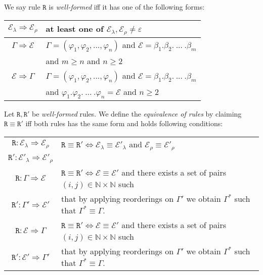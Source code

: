 \documentclass{entcs}
\renewcommand{\~}[0]{\texttildelow}
\begin{document}
\begin{defn} \label{well}
We say rule $\mathtt{R}$ is \emph{well-formed} iff it has one of the following forms:
\begin{center}
\begin{tabular}{c@{\hskip 1in}l}
	$\mathcal{E}_\lambda \Rightarrow \mathcal{E}_\rho$ & at least one of $\mathcal{E}_\lambda, \mathcal{E}_\rho \neq \varepsilon $\\
	\hline
	$\Gamma \Rightarrow \mathcal{E}$ & $\Gamma = (\varphi_1, \varphi_2, ..., \varphi_n) $ and $\mathcal{E} = \beta_1.\beta_2.~...~.\beta_m$ \\
	 & and $ m \geq n $ and $n \geq 2$ \\
	 \hline
	$\mathcal{E} \Rightarrow \Gamma$ & $\Gamma = (\varphi_1, \varphi_2, ..., \varphi_n) $ and $\mathcal{E} = \beta_1.\beta_2.~...~.\beta_m$ \\
	 & and $ \varphi_1.\varphi_2.~...~.\varphi_n = \mathcal{E} $ and $n \geq 2$\\
\end{tabular}
\end{center}
\end{defn}

\begin{defn}
Let $\mathtt{R},\mathtt{R}'$ be \emph{well-formed} rules. We define the \emph{equivalence of rules} by claiming $\mathtt{R} \equiv \mathtt{R}'$ iff both rules has the same form and holds following conditions:

\begin{center}
\begin{tabular}{c@{\hskip 1in}l}
	$\mathtt{R}: \mathcal{E}_\lambda \Rightarrow \mathcal{E}_\rho$ & $\mathtt{R} \equiv \mathtt{R}' \Leftrightarrow \mathcal{E}_\lambda \equiv \mathcal{E}'_\lambda$ and $\mathcal{E}_\rho \equiv \mathcal{E}'_\rho$ \\
	$\mathtt{R}': \mathcal{E}'_\lambda \Rightarrow \mathcal{E}'_\rho$ &  \\
	\hline
	$\mathtt{R}: \Gamma \Rightarrow \mathcal{E}$ & $\mathtt{R} \equiv \mathtt{R}' \Leftrightarrow \mathcal{E} \equiv \mathcal{E}'$ and there exists a set of pairs $(i,j) \in \mathbb{N} \times \mathbb{N}$ such \\
	$\mathtt{R}': \Gamma' \Rightarrow \mathcal{E}'$ & that by applying reorderings on $\Gamma'$ we obtain $\Gamma^*$ such that $\Gamma^* \equiv \Gamma$.  \\
	\hline
	$\mathtt{R}: \mathcal{E} \Rightarrow \Gamma $ & $\mathtt{R} \equiv \mathtt{R}' \Leftrightarrow \mathcal{E} \equiv \mathcal{E}'$ and there exists a set of pairs $(i,j) \in \mathbb{N} \times \mathbb{N}$ such \\
	$\mathtt{R}': \mathcal{E}' \Rightarrow \Gamma' $ & that by applying reorderings on $\Gamma'$ we obtain $\Gamma^*$ such that $\Gamma^* \equiv \Gamma$.  \\
\end{tabular}
\end{center}

\end{defn}
\end{document}
